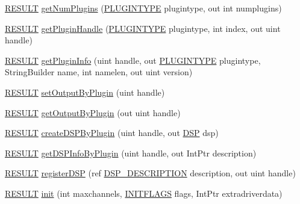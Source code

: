 \begin{DoxyCompactItemize}
\item 
\hyperlink{namespace_f_m_o_d_a305d1176ef3f8c8815861a60407ac33d}{R\+E\+S\+U\+LT} \hyperlink{class_f_m_o_d_1_1_system_a59d69eb21e8735667a3d15482d5e343c}{get\+Num\+Plugins} (\hyperlink{namespace_f_m_o_d_ad838bca9e846c3461c840ea9865dfcea}{P\+L\+U\+G\+I\+N\+T\+Y\+PE} plugintype, out int numplugins)
\item 
\hyperlink{namespace_f_m_o_d_a305d1176ef3f8c8815861a60407ac33d}{R\+E\+S\+U\+LT} \hyperlink{class_f_m_o_d_1_1_system_a8edd8c2fa884aa3a01f0d8d97a4ea7f7}{get\+Plugin\+Handle} (\hyperlink{namespace_f_m_o_d_ad838bca9e846c3461c840ea9865dfcea}{P\+L\+U\+G\+I\+N\+T\+Y\+PE} plugintype, int index, out uint handle)
\item 
\hyperlink{namespace_f_m_o_d_a305d1176ef3f8c8815861a60407ac33d}{R\+E\+S\+U\+LT} \hyperlink{class_f_m_o_d_1_1_system_a8d325e9e080fc76aa8fe84537d696cd3}{get\+Plugin\+Info} (uint handle, out \hyperlink{namespace_f_m_o_d_ad838bca9e846c3461c840ea9865dfcea}{P\+L\+U\+G\+I\+N\+T\+Y\+PE} plugintype, String\+Builder name, int namelen, out uint version)
\item 
\hyperlink{namespace_f_m_o_d_a305d1176ef3f8c8815861a60407ac33d}{R\+E\+S\+U\+LT} \hyperlink{class_f_m_o_d_1_1_system_adb9658d5d930695dd958740d11cd18ec}{set\+Output\+By\+Plugin} (uint handle)
\item 
\hyperlink{namespace_f_m_o_d_a305d1176ef3f8c8815861a60407ac33d}{R\+E\+S\+U\+LT} \hyperlink{class_f_m_o_d_1_1_system_a613e0b33b13d4db91f355aa4a21215e4}{get\+Output\+By\+Plugin} (out uint handle)
\item 
\hyperlink{namespace_f_m_o_d_a305d1176ef3f8c8815861a60407ac33d}{R\+E\+S\+U\+LT} \hyperlink{class_f_m_o_d_1_1_system_a1a85a7b523518ba14073de66c091fb84}{create\+D\+S\+P\+By\+Plugin} (uint handle, out \hyperlink{class_f_m_o_d_1_1_d_s_p}{D\+SP} dsp)
\item 
\hyperlink{namespace_f_m_o_d_a305d1176ef3f8c8815861a60407ac33d}{R\+E\+S\+U\+LT} \hyperlink{class_f_m_o_d_1_1_system_a5cbabf0ec3a3aa5ffa7b02909793b494}{get\+D\+S\+P\+Info\+By\+Plugin} (uint handle, out Int\+Ptr description)
\item 
\hyperlink{namespace_f_m_o_d_a305d1176ef3f8c8815861a60407ac33d}{R\+E\+S\+U\+LT} \hyperlink{class_f_m_o_d_1_1_system_ae70aba013770ed657c4a7582c2664a3d}{register\+D\+SP} (ref \hyperlink{struct_f_m_o_d_1_1_d_s_p___d_e_s_c_r_i_p_t_i_o_n}{D\+S\+P\+\_\+\+D\+E\+S\+C\+R\+I\+P\+T\+I\+ON} description, out uint handle)
\item 
\hyperlink{namespace_f_m_o_d_a305d1176ef3f8c8815861a60407ac33d}{R\+E\+S\+U\+LT} \hyperlink{class_f_m_o_d_1_1_system_ae03363b59a1007c7578a247c2fd49ecf}{init} (int maxchannels, \hyperlink{namespace_f_m_o_d_a1eb59ee0c14b7edd1c75e577ecdca8d3}{I\+N\+I\+T\+F\+L\+A\+GS} flags, Int\+Ptr extradriverdata)

\end{DoxyCompactItemize}
